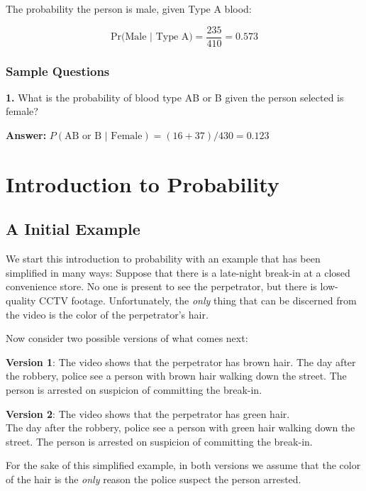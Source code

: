 \documentclass[
]{book}
\begin{document}
The probability the person is male, given Type A blood:

\[
\mbox{Pr(Male | Type A)} = \frac{235}{410} = 0.573
\]

\hypertarget{sample-questions-2}{%
\subsection{Sample Questions}\label{sample-questions-2}}

\textbf{1.} What is the probability of blood type AB or B given the person selected is female?

\textbf{Answer:} \(P(\text{AB or B | Female}) = (16 + 37) / 430 = 0.123\)

\hypertarget{introduction-to-probability}{%
\chapter{Introduction to Probability}\label{introduction-to-probability}}

\hypertarget{a-initial-example}{%
\section{A Initial Example}\label{a-initial-example}}

We start this introduction to probability with an example that has been simplified in many ways:
Suppose that there is a late-night break-in at a closed convenience store.
No one is present to see the perpetrator, but there is low-quality CCTV footage.
Unfortunately, the \emph{only} thing that can be discerned from the video is the color of the perpetrator's hair.

Now consider two possible versions of what comes next:

\textbf{Version 1}: The video shows that the perpetrator has brown hair.
The day after the robbery, police see a person with brown hair walking down the street.
The person is arrested on suspicion of committing the break-in.

\textbf{Version 2}: The video shows that the perpetrator has green hair.\\
The day after the robbery, police see a person with green hair walking down the street.
The person is arrested on suspicion of committing the break-in.

For the sake of this simplified example,
in both versions we assume that the color of the hair is the \emph{only} reason the police suspect the person arrested.
\end{document}
